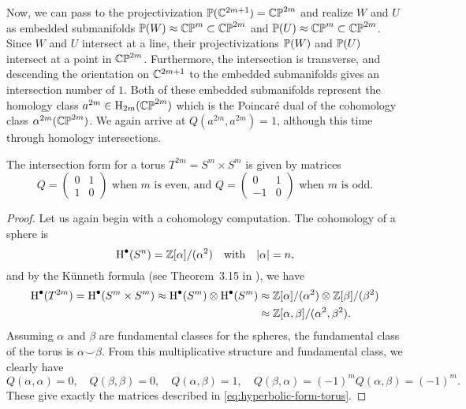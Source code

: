 Now, we can pass to the projectivization $\P(\C^{2m+1})=\CP^{2m}$ and realize $W$ and $U$ as embedded submanifolds $\P(W)\approx \CP^m\subset \CP^{2m}$ and $\P(U)\approx \CP^m\subset \CP^{2m}$. Since $W$ and $U$ intersect at a line, their projectivizations $\P(W)$ and $\P(U)$ intersect at a point in $\CP^{2m}$. Furthermore, the intersection is transverse, and descending the orientation on $\C^{2m+1}$ to the embedded submanifolds gives an intersection number of $1$. Both of these embedded submanifolds represent the homology class $a^{2m}\in \H_{2m}(\CP^{2m})$ which is the Poincar\'e dual of the cohomology class $\alpha^{2m}(\CP^{2m})$. We again arrive at $Q(a^{2m}, a^{2m})=1$, although this time through homology intersections.

\begin{proposition}\label{prop:intersection-form-torus}
	The intersection form for a torus $T^{2m}=S^m\times S^m$ is given by matrices
	\begin{equation}\label{eq:hyperbolic-form-torus}
		Q = \begin{pmatrix}0 & 1 \\ 1 & 0\end{pmatrix}
		\textrm{ when }m\textrm{ is even, and }
		Q = \begin{pmatrix}0 & 1 \\ -1 & 0\end{pmatrix}
		\textrm{ when }m\textrm{ is odd.}
	\end{equation}
\end{proposition}
\begin{proof}
	Let us again begin with a cohomology computation. The cohomology of a sphere is
	\begin{equation}
		\H^\bullet(S^n) = \Z[\alpha]/(\alpha^2)\quad\textrm{with}\quad |\alpha| = n,
	\end{equation}
	and by the K\"unneth formula (see Theorem~3.15 in \cite{hatcher2002topology}), we have
	\begin{equation}
		\begin{aligned}
			\H^\bullet(T^{2m})=\H^\bullet(S^m\times S^m)\cong \H^\bullet(S^m)\otimes \H^\bullet(S^m)
			 & \cong \Z[\alpha]/(\alpha^2)\otimes \Z[\beta]/(\beta^2) \\
			 & \cong \Z[\alpha,\beta]/(\alpha^2,\beta^2).
		\end{aligned}
	\end{equation}
	Assuming $\alpha$ and $\beta$ are fundamental classes for the spheres, the fundamental class of the torus is $\alpha\smile \beta$. From this multiplicative structure and fundamental class, we clearly have
	\begin{equation}
		Q(\alpha, \alpha)=0, \quad Q(\beta,\beta)=0, \quad Q(\alpha,\beta)=1,\quad Q(\beta,\alpha)=(-1)^m Q(\alpha,\beta)=(-1)^m.
	\end{equation}
	These give exactly the matrices described in \cref{eq:hyperbolic-form-torus}.
\end{proof}

